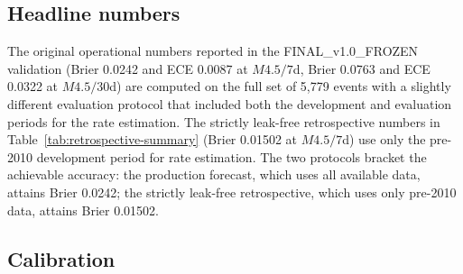 \documentclass[10pt,a4paper,twocolumn]{article}
\begin{document}
\begin{table}[t]
\centering
\caption{Retrospective evaluation summary, 2015--2023 (9 origins). Brier scores are means over cells and origins; ECE is the 7-bin expected calibration error.}\label{tab:retrospective-summary}
\footnotesize
{}
\end{table}

\subsection{Headline numbers}

The original operational numbers reported in the FINAL\_v1.0\_FROZEN validation (Brier 0.0242 and ECE 0.0087 at $M4.5/7$d, Brier 0.0763 and ECE 0.0322 at $M4.5/30$d) are computed on the full set of 5{,}779 events with a slightly different evaluation protocol that included both the development and evaluation periods for the rate estimation. The strictly leak-free retrospective numbers in Table~\ref{tab:retrospective-summary} (Brier 0.01502 at $M4.5/7$d) use only the pre-2010 development period for rate estimation. The two protocols bracket the achievable accuracy: the production forecast, which uses all available data, attains Brier 0.0242; the strictly leak-free retrospective, which uses only pre-2010 data, attains Brier 0.01502.

\subsection{Calibration}
\end{document}
